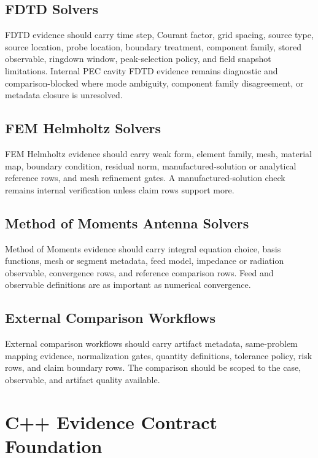 \documentclass[11pt,a4paper]{article}
\begin{document}
\subsection{FDTD Solvers}

FDTD evidence should carry time step, Courant factor, grid spacing, source type, source location, probe location, boundary treatment, component family, stored observable, ringdown window, peak-selection policy, and field snapshot limitations. Internal PEC cavity FDTD evidence remains diagnostic and comparison-blocked where mode ambiguity, component family disagreement, or metadata closure is unresolved.

\subsection{FEM Helmholtz Solvers}

FEM Helmholtz evidence should carry weak form, element family, mesh, material map, boundary condition, residual norm, manufactured-solution or analytical reference rows, and mesh refinement gates. A manufactured-solution check remains internal verification unless claim rows support more.

\subsection{Method of Moments Antenna Solvers}

Method of Moments evidence should carry integral equation choice, basis functions, mesh or segment metadata, feed model, impedance or radiation observable, convergence rows, and reference comparison rows. Feed and observable definitions are as important as numerical convergence.

\subsection{External Comparison Workflows}

External comparison workflows should carry artifact metadata, same-problem mapping evidence, normalization gates, quantity definitions, tolerance policy, risk rows, and claim boundary rows. The comparison should be scoped to the case, observable, and artifact quality available.

\section{C++ Evidence Contract Foundation}
\label{sec:cpp-evidence-contract-foundation}
\end{document}
